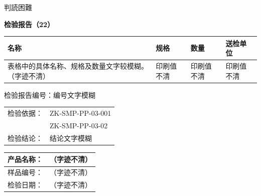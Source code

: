 \documentclass[UTF8,10pt,a4paper,fontset=fandol]{ctexart}
\newcommand{\fieldvalue}[1]{#1}
\newcommand{\handwritten}[1]{#1}
\newcommand{\TODO}[1]{#1}
\begin{document}
\vspace{0.5em}

\noindent
\begin{flushright}
\handwritten{判読困難}
\end{flushright}


\newpage

\begin{center}
\textbf{检验报告（22）}
\end{center}

\begin{tabularx}{\textwidth}{|X|X|X|X|}
\hline
名称 & 规格 & 数量 & 送检单位 \\ \hline
\TODO{表格中的具体名称、规格及数量文字较模糊。}
%
\fieldvalue{\handwritten{（字迹不清）}} &
\TODO{印刷值不清} &
\TODO{印刷值不清} &
\TODO{印刷值不清} \\ \hline
\end{tabularx}

\vspace{0.5em}

检验报告编号：\TODO{编号文字模糊}

\vspace{0.5em}

\begin{tabularx}{\textwidth}{@{}lX@{}}
检验依据： & ZK-SMP-PP-03-001 \\
           & ZK-SMP-PP-03-02 \\
检验结论： & \TODO{结论文字模糊} \\
\end{tabularx}

\vspace{0.5em}

\begin{tabularx}{\textwidth}{|l|X|}
\hline
产品名称： &
\fieldvalue{\handwritten{（字迹不清）}} \\ \hline
样品编号： &
\fieldvalue{\handwritten{（字迹不清）}} \\ \hline
检验日期： &
\fieldvalue{\handwritten{（字迹不清）}} \\ \hline
\end{tabularx}
\end{document}
